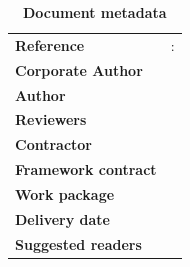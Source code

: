 \clearpage


\setlength{\headheight}{1cm}
\setlength{\footskip}{18mm}
\addtolength{\textheight}{-\footskip}
\pagestyle{empty}

\clearpage




\begin{flushleft}
	\begin{table}[!b]
		\caption*{\large\textbf{Document metadata}}
		\footnotesize
		\begin{tabular}{p{3.6cm}p{\textwidth-5cm}}
			\textbf{Reference}          & \DelNumber: \DelTitle \\
			\textbf{Corporate Author}   & \DelCorporateAuthor   \\
			\textbf{Author}             & \DelAuthor            \\
			\textbf{Reviewers}          & \DelReviewer          \\
			\textbf{Contractor}         & \DelContractor        \\
			\textbf{Framework contract} & \DelFrameworkContract\\
			\textbf{Work package}       & \DelNumber            \\
			\textbf{Delivery date}      & \DelDate              \\
			\textbf{Suggested readers}  & \DelReaders           \\
		\end{tabular}
	\end{table}
\end{flushleft}


\clearpage

\clearpage


\pagestyle{fancy}
\fancyhf{}
\fancyhead[RE]{\slshape\nouppercase{\rightmark}}      %
\fancyhead[LO]{\slshape\nouppercase{\leftmark}}     %
\cfoot{\thepage}

